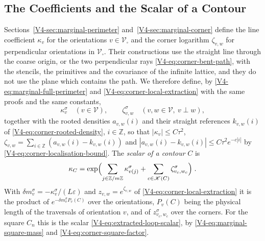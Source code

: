 \documentclass[11pt]{article}
\numberwithin{equation}{section}
\theoremstyle{remark}
\theoremstyle{plain}
\begin{document}
\subsection{The Coefficients and the Scalar of a Contour}\label{sec:torus-coefficients}

Sections~\ref{V4-sec:marginal-perimeter} and~\ref{V4-sec:marginal-corner} define the line coefficient $\kappa_v$ for the orientations $v\in\mathscr V_{\square}$ and the corner logarithm $\zeta_{v,w}$ for perpendicular orientations in $\mathscr V_{\square}$. Their constructions use the straight line through the coarse origin, or the two perpendicular rays \eqref{V4-eq:corner-bent-path}, with the stencils, the primitives and the covariance of the infinite lattice, and they do not use the plane which contains the path. We therefore define, by \eqref{V4-eq:marginal-full-perimeter} and \eqref{V4-eq:corner-local-extraction} with the same proofs and the same constants,
\begin{equation}\label{eq:torus-all-orientations}
    \kappa^{\sigma}_v\quad(v\in\mathscr V),
    \qquad
    \zeta^{\sigma}_{v,w}\quad(v,w\in\mathscr V,\ v\perp w),
\end{equation}
together with the rooted densities $a_{v,w}(i)$ and their straight references $k_{v,w}(i)$ of \eqref{V4-eq:corner-rooted-density}, $i\in\mathbb Z$, so that $|\kappa_v|\leqslant C\tau^2$, $\zeta_{v,w}=\sum_{i\in\mathbb Z}(a_{v,w}(i)-k_{v,w}(i))$ and $| a_{v,w}(i)-k_{v,w}(i)|\leqslant C\tau^2e^{-c| i|}$ by \eqref{V4-eq:corner-localisation-bound}. The \emph{scalar of a contour} $C$ is
\begin{equation}\label{eq:torus-scalar-of-contour}
    \kappa_C=\exp\Bigl(\sum_{j\in\mathbb Z/m\mathbb Z}\kappa^{\sigma}_{v(j)}+\sum_{c\in\mathscr K(C)}\zeta^{\sigma}_{v_c,w_c}\Bigr)\;.
\end{equation}
With $\delta m^{\sigma}_v=-\kappa^{\sigma}_v/(L\varepsilon)$ and $z_{v,w}=e^{\zeta_{v,w}}$ of \eqref{V4-eq:corner-local-extraction} it is the product of $e^{-\delta m^{\sigma}_vP_v(C)}$ over the orientations, $P_v(C)$ being the physical length of the traversals of orientation $v$, and of $z^{\sigma}_{v_c,w_c}$ over the corners. For the square $C_n$ this is the scalar \eqref{V4-eq:extracted-loop-scalar}, by \eqref{V4-eq:marginal-square-mass} and \eqref{V4-eq:corner-square-factor}.
\end{document}
